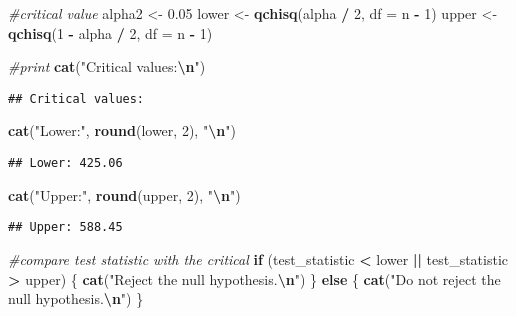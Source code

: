 \documentclass[
]{article}
\newenvironment{Shaded}{\begin{snugshade}}{\end{snugshade}}
\newcommand{\AttributeTok}[1]{\textcolor[rgb]{0.13,0.29,0.53}{#1}}
\newcommand{\CommentTok}[1]{\textcolor[rgb]{0.56,0.35,0.01}{\textit{#1}}}
\newcommand{\ControlFlowTok}[1]{\textcolor[rgb]{0.13,0.29,0.53}{\textbf{#1}}}
\newcommand{\DecValTok}[1]{\textcolor[rgb]{0.00,0.00,0.81}{#1}}
\newcommand{\FloatTok}[1]{\textcolor[rgb]{0.00,0.00,0.81}{#1}}
\newcommand{\FunctionTok}[1]{\textcolor[rgb]{0.13,0.29,0.53}{\textbf{#1}}}
\newcommand{\NormalTok}[1]{#1}
\newcommand{\OtherTok}[1]{\textcolor[rgb]{0.56,0.35,0.01}{#1}}
\newcommand{\SpecialCharTok}[1]{\textcolor[rgb]{0.81,0.36,0.00}{\textbf{#1}}}
\newcommand{\StringTok}[1]{\textcolor[rgb]{0.31,0.60,0.02}{#1}}
\begin{document}
\begin{Shaded}
\begin{Highlighting}[]
\CommentTok{\#critical value}
\NormalTok{alpha2 }\OtherTok{\textless{}{-}} \FloatTok{0.05}
\NormalTok{lower }\OtherTok{\textless{}{-}} \FunctionTok{qchisq}\NormalTok{(alpha }\SpecialCharTok{/} \DecValTok{2}\NormalTok{, }\AttributeTok{df =}\NormalTok{ n }\SpecialCharTok{{-}} \DecValTok{1}\NormalTok{)}
\NormalTok{upper }\OtherTok{\textless{}{-}} \FunctionTok{qchisq}\NormalTok{(}\DecValTok{1} \SpecialCharTok{{-}}\NormalTok{ alpha }\SpecialCharTok{/} \DecValTok{2}\NormalTok{, }\AttributeTok{df =}\NormalTok{ n }\SpecialCharTok{{-}} \DecValTok{1}\NormalTok{)}

\CommentTok{\#print}
\FunctionTok{cat}\NormalTok{(}\StringTok{"Critical values:}\SpecialCharTok{\textbackslash{}n}\StringTok{"}\NormalTok{)}
\end{Highlighting}
\end{Shaded}

\begin{verbatim}
## Critical values:
\end{verbatim}

\begin{Shaded}
\begin{Highlighting}[]
\FunctionTok{cat}\NormalTok{(}\StringTok{"Lower:"}\NormalTok{, }\FunctionTok{round}\NormalTok{(lower, }\DecValTok{2}\NormalTok{), }\StringTok{"}\SpecialCharTok{\textbackslash{}n}\StringTok{"}\NormalTok{)}
\end{Highlighting}
\end{Shaded}

\begin{verbatim}
## Lower: 425.06
\end{verbatim}

\begin{Shaded}
\begin{Highlighting}[]
\FunctionTok{cat}\NormalTok{(}\StringTok{"Upper:"}\NormalTok{, }\FunctionTok{round}\NormalTok{(upper, }\DecValTok{2}\NormalTok{), }\StringTok{"}\SpecialCharTok{\textbackslash{}n}\StringTok{"}\NormalTok{)}
\end{Highlighting}
\end{Shaded}

\begin{verbatim}
## Upper: 588.45
\end{verbatim}

\begin{Shaded}
\begin{Highlighting}[]
\CommentTok{\#compare test statistic with the critical}
\ControlFlowTok{if}\NormalTok{ (test\_statistic }\SpecialCharTok{\textless{}}\NormalTok{ lower }\SpecialCharTok{||}\NormalTok{ test\_statistic }\SpecialCharTok{\textgreater{}}\NormalTok{ upper) \{}
  \FunctionTok{cat}\NormalTok{(}\StringTok{"Reject the null hypothesis.}\SpecialCharTok{\textbackslash{}n}\StringTok{"}\NormalTok{)}
\NormalTok{\} }\ControlFlowTok{else}\NormalTok{ \{}
  \FunctionTok{cat}\NormalTok{(}\StringTok{"Do not reject the null hypothesis.}\SpecialCharTok{\textbackslash{}n}\StringTok{"}\NormalTok{)}
\NormalTok{\}}
\end{Highlighting}
\end{Shaded}
\end{document}

